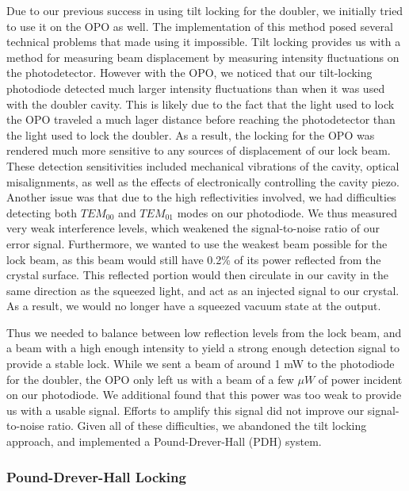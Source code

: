 Due to our previous success in using tilt locking for the doubler, we
initially tried to use it on the OPO as well.  The implementation of this
method posed several technical problems that made using it impossible.  Tilt
locking provides us with a method for measuring beam displacement by measuring
intensity fluctuations on the photodetector.  However with the OPO, we noticed
that our tilt-locking photodiode detected much larger intensity fluctuations
than when it was used with the doubler cavity.  This is likely due to the fact
that the light used to lock the OPO traveled a much lager distance before
reaching the photodetector than the light used to lock the doubler.  As a
result, the locking for the OPO was rendered much more sensitive to any
sources of displacement of our lock beam.  These detection sensitivities
included mechanical vibrations of the cavity, optical misalignments, as well
as the effects of electronically controlling the cavity piezo.  Another issue
was that due to the high reflectivities involved, we had difficulties
detecting both $TEM_{00}$ and $TEM_{01}$ modes on our photodiode.  We thus measured very weak interference levels, which weakened the signal-to-noise ratio of our error signal.  Furthermore, we wanted to use the weakest beam possible for the lock beam, as this beam would still have 0.2\% of its power reflected from the crystal surface.  This reflected portion would then circulate in our cavity in the same direction as the squeezed light, and act as an injected signal to our crystal.  As a result, we would no longer have a squeezed vacuum state at the output.

Thus we needed to balance between low reflection levels from the lock beam, and a beam with a high enough intensity to yield a strong enough detection signal to provide a stable lock.  While we sent a beam of around 1 mW to the photodiode for the doubler, the OPO only left us with a beam of a few $\mu W$ of power incident on our photodiode.  We additional found that this power was too weak to provide us with a usable signal.  Efforts to amplify this signal did not improve our signal-to-noise ratio.  Given all of these difficulties, we abandoned the tilt locking approach, and implemented a Pound-Drever-Hall (PDH) system.

\subsubsection{Pound-Drever-Hall Locking}
\label{pound_drever_hall_locking} 



